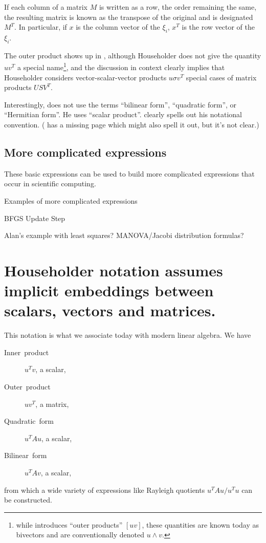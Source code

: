 If each column of a matrix $M$ is written as a row, the order remaining the
same, the resulting matrix is known as the transpose of the original and is
designated $M^T$. In particular, if $x$ is the column vector of the $\xi_i$,
$x^T$ is the row vector of the $\xi_i$.

The outer product shows up in \cite[Sec. 2.24]{Householder1953}, although
Householder does not give the quantity $u v^T$ a special name\footnote{while
\cite[Sec. 2.03]{Householder1953} introduces ``outer products'' $[u v]$, these
quantities are known today as bivectors and are conventionally denoted $u
\wedge v$.}, and the discussion in context clearly implies that Householder
considers vector-scalar-vector products $u \sigma v^T$ special cases of matrix
products $U S V^T$.

Interestingly, \cite{Householder1953} does not use the terms ``bilinear form'',
``quadratic form'', or ``Hermitian form''. He uses ``scalar product''.
\cite{Householder1955} clearly spells out his notational convention.
(\cite{Householder1953} has a missing page which might also spell it out, but
it's not clear.)



\subsection{More complicated expressions}

These basic expressions can be used to build more complicated expressions that
occur in scientific computing.

Examples of more complicated expressions

BFGS Update Step

Alan's example with least squares? MANOVA/Jacobi distribution formulas?

\section{Householder notation assumes implicit embeddings between scalars,
vectors and matrices.}

This notation is what we associate today with modern linear algebra.
We have
\begin{description}
\item [{Inner~product}] $u^{T}v$, a scalar,
\item [{Outer~product}] $uv^{T}$, a matrix,
\item [{Quadratic~form}] $u^{T}Au$, a scalar,
\item [{Bilinear~form}] $u^{T}Av$, a scalar,
\end{description}
from which a wide variety of expressions like Rayleigh quotients $u^{T}Au/u^{T}u$
can be constructed.

